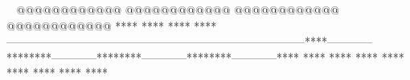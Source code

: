    @@@@@@@@@@@@        @@@@@@@@@@@@        @@@@@@@@@@@@        @@@@@@@@@@@@            ****                ****                ****                ****        --------------------------------------------------------------------------------****------------********------------********------------********------------****    ****    ****        ****    ****        ****    ****        ****    ****    
